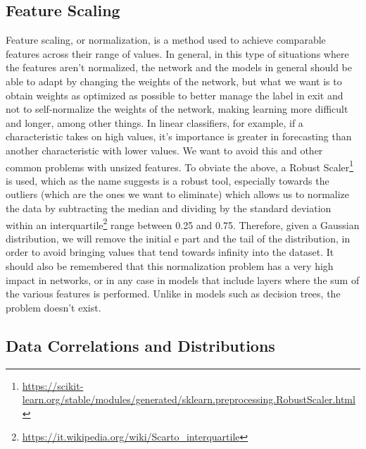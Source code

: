 \documentclass{article}
\begin{document}
\subsection{Feature Scaling}
\label{sec:Feature_Scaling}
Feature scaling, or normalization, is a method used to achieve comparable features across their range of values. In general, in this type of situations where the features aren't normalized, the network and the models in general should be able to adapt by changing the weights of the network, but what we want is to obtain weights as optimized as possible to better manage the label in exit and not to self-normalize the weights of the network, making learning more difficult and longer, among other things.
\noindent
In linear classifiers, for example, if a characteristic takes on high values, it's importance is greater in forecasting than another characteristic with lower values. We want to avoid this and other common problems with unsized features.
\noindent
To obviate the above, a Robust Scaler\footnote{\url{https://scikit-learn.org/stable/modules/generated/sklearn.preprocessing.RobustScaler.html}} is used, which as the name suggests is a robust tool, especially towards the outliers (which are the ones we want to eliminate) which allows us to normalize the data by subtracting the median and dividing by the standard deviation within an interquartile\footnote{\url{https://it.wikipedia.org/wiki/Scarto_interquartile}} range between 0.25 and 0.75. Therefore, given a Gaussian distribution, we will remove the initial e part and the tail of the distribution, in order to avoid bringing values that tend towards infinity into the dataset.
\noindent
It should also be remembered that this normalization problem has a very high impact in networks, or in any case in models that include layers where the sum of the various features is performed. Unlike in models such as decision trees, the problem doesn't exist.

\subsection{Data Correlations and Distributions}
\label{sec:Data_Correlations_and_Distributions}
\end{document}
